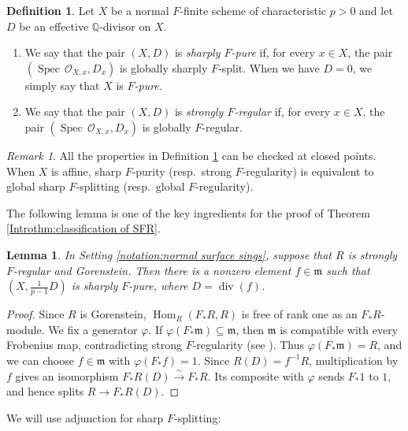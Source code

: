 \documentclass[12pt]{amsart}
\def\phi{\varphi}
\def\Hom{\operatorname{Hom}}
\def\Spec{\operatorname{Spec}}
\def\m{{\mathfrak m}}
\newcommand{\Q}{\mathbb{Q}}
\newcommand{\sO}{\mathcal{O}}
\theoremstyle{plain}
\newtheorem{lem}[thm]{Lemma}
\theoremstyle{definition}
\newtheorem{defn}[thm]{Definition}
\theoremstyle{remark}
\newtheorem{rem}[thm]{Remark}
\newtheorem{defn and notation}[thm]{Definition and Notation}
\theoremstyle{plain}
\numberwithin{equation}{thm}
\begin{document}
\begin{defn}\label{def:GFS and GFR(local)}
Let $X$ be a normal $F$-finite scheme of characteristic $p>0$ and let $D$ be an effective $\Q$-divisor on $X$.
\begin{enumerate}
\item[\textup{(1)}] We say that the pair $(X, D)$ is {\em sharply $F$-pure} if, for every $x\in X$, the pair $(\Spec\,\sO_{X,x},D_x)$
is globally sharply $F$-split.
When we have $D=0$, we simply say that $X$ is \emph{$F$-pure}.
\item[\textup{(2)}] We say that the pair $(X, D)$ is {\em strongly $F$-regular} if, for every $x\in X$, the pair $(\Spec\,\sO_{X,x},D_x)$
is globally $F$-regular.
\end{enumerate}
\end{defn}

\begin{rem}
All the properties in Definition \ref{def:GFS and GFR(local)} can be checked at closed points.
When $X$ is affine, sharp $F$-purity (resp.~strong $F$-regularity) is equivalent to global sharp $F$-splitting (resp.~global $F$-regularity). 
\end{rem}

The following lemma is one of the key ingredients for the proof of Theorem \ref{Introthm:classification of SFR}.

\begin{lem}\label{lem:key}
    In Setting \ref{notation:normal surface sings}, suppose that $R$ is strongly $F$-regular and Gorenstein.
    Then there is a nonzero element $f\in\m$ such that
    $(X,\frac{1}{p-1}D)$ is sharply $F$-pure, where $D=\operatorname{div}(f)$.
\end{lem}
\begin{proof}
Since $R$ is Gorenstein, $\Hom_R(F_*R,R)$ is free of rank one as an $F_*R$-module. We fix a generator $\phi$.
If $\phi(F_*\m)\subseteq\m$, then $\m$ is compatible with every Frobenius map, contradicting strong $F$-regularity
(see \cite[Propositions 4.1 and 4.8(i)]{Schwede(F-adj)}).
Thus $\phi(F_*\m)=R$, and we can choose $f\in\m$ with $\phi(F_*f)=1$.
Since $R(D)=f^{-1}R$, multiplication by $f$ gives an isomorphism
$F_*R(D)\xrightarrow{\sim}F_*R$.
Its composite with $\phi$ sends $F_*1$ to $1$, and hence splits
$R\to F_*R(D)$.
\end{proof}

We will use adjunction for sharp $F$-splitting:
\end{document}

